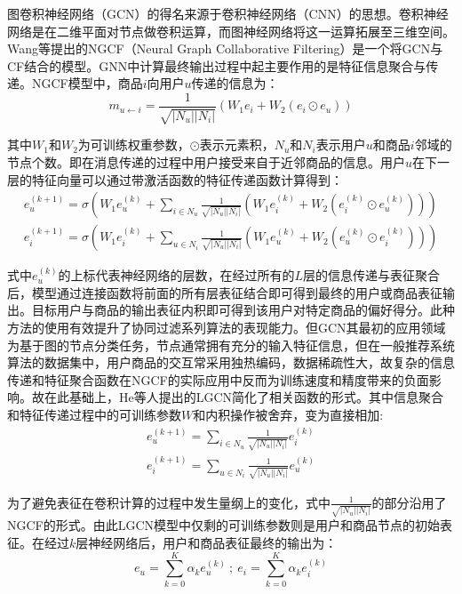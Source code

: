 \documentclass[lang=cn,11pt,a4paper,cite=authoryear]{elegantpaper}
\begin{document}
图卷积神经网络（GCN）的得名来源于卷积神经网络（CNN）的思想。卷积神经网络是在二维平面对节点做卷积运算，而图神经网络将这一运算拓展至三维空间。Wang等提出的\cite{wang_neural_2019}NGCF（Neural Graph Collaborative Filtering）是一个将GCN与CF结合的模型。GNN中计算最终输出过程中起主要作用的是特征信息聚合与传递。NGCF模型中，商品$i$向用户$u$传递的信息为：
\begin{equation}
  m_{u \leftarrow i} = \frac{1}{\sqrt{|N_u||N_i|}}(W_1e_i+W_2(e_i \odot e_u))
\end{equation}

其中$W_1$和$W_2$为可训练权重参数，$\odot$表示元素积，$N_u$和$N_i$表示用户$u$和商品$i$邻域的节点个数。即在消息传递的过程中用户接受来自于近邻商品的信息。用户$u$在下一层的特征向量可以通过带激活函数的特征传递函数计算得到：
\begin{gather}
  e_u^{(k+1)} = \sigma(W_1e_u^{(k)}+\sum_{i\in N_u}\frac{1}{\sqrt{|N_u||N_i|}}(W_1e_i^{(k)}+W_2(e_i^{(k)}\odot e_u^{(k)}))) \\
  e_i^{(k+1)} = \sigma(W_1e_i^{(k)}+\sum_{u\in N_i}\frac{1}{\sqrt{|N_u||N_i|}}(W_1e_u^{(k)}+W_2(e_u^{(k)}\odot e_i^{(k)})))
\end{gather}

式中$e_u^{(k)}$的上标代表神经网络的层数，在经过所有的$L$层的信息传递与表征聚合后，模型通过连接函数将前面的所有层表征结合即可得到最终的用户或商品表征输出。目标用户与商品的输出表征内积即可得到该用户对特定商品的偏好得分。此种方法的使用有效提升了协同过滤系列算法的表现能力。但GCN其最初的应用领域为基于图的节点分类任务，节点通常拥有充分的输入特征信息，但在一般推荐系统算法的数据集中，用户商品的交互常采用独热编码，数据稀疏性大，故复杂的信息传递和特征聚合函数在NGCF的实际应用中反而为训练速度和精度带来的负面影响。故在此基础上，He等人提出的\cite{he_lightgcn_2020}LGCN简化了相关函数的形式。其中信息聚合和特征传递过程中的可训练参数$W$和内积操作被舍弃，变为直接相加:
\begin{gather}
  e_u^{(k+1)} = \sum_{i\in N_u}\frac{1}{\sqrt{|N_u||N_i|}}e_i^{(k)} \\
  e_i^{(k+1)} = \sum_{u\in N_i}\frac{1}{\sqrt{|N_u||N_i|}}e_u^{(k)}
\end{gather}

为了避免表征在卷积计算的过程中发生量纲上的变化，式中$\frac{1}{\sqrt{|N_u||N_i|}}$的部分沿用了NGCF的形式。由此LGCN模型中仅剩的可训练参数则是用户和商品节点的初始表征。在经过$k$层神经网络后，用户和商品表征最终的输出为：
\begin{equation}
  e_u = \sum_{k=0}^K\alpha_ke_u^{(k)} \ ; \ e_i = \sum_{k=0}^K\alpha_ke_i^{(k)}
\end{equation}
\end{document}
